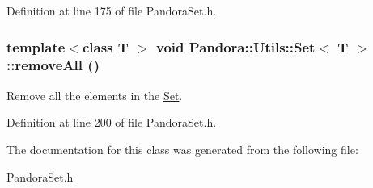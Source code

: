 Definition at line 175 of file PandoraSet.h.\hypertarget{classPandora_1_1Utils_1_1Set_aa134d362ed2baacc3ca0864cb6f10cb7}{
\subsubsection[{removeAll}]{\setlength{\rightskip}{0pt plus 5cm}template$<$class T $>$ void {\bf Pandora::Utils::Set}$<$ T $>$::removeAll ()}}
\label{classPandora_1_1Utils_1_1Set_aa134d362ed2baacc3ca0864cb6f10cb7}


Remove all the elements in the \hyperlink{classPandora_1_1Utils_1_1Set}{Set}. 

Definition at line 200 of file PandoraSet.h.

The documentation for this class was generated from the following file:\begin{DoxyCompactItemize}
\item 
PandoraSet.h\end{DoxyCompactItemize}
